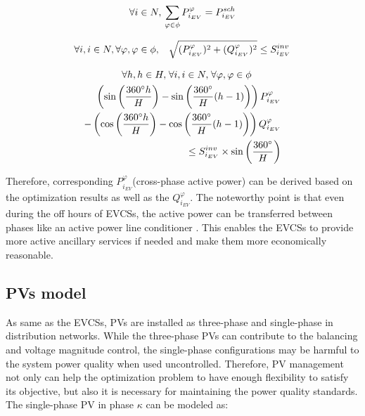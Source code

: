 \documentclass[journal]{IEEEtran}
\begin{document}
\begin{equation}\label{three_phase_EVCSs_model1}
\forall i \in N, \hskip 2pt \displaystyle\sum _{\varphi \in \phi} P_{i_{EV}}^{\varphi} = P_{i_{EV}}^{sch}
\end{equation}

\begin{equation}\label{three_phase_EVCSs_model2}
\forall i, i \in N, \forall \varphi, \varphi \in \phi, \hskip 0.7pc \sqrt{(P_{i_{EV}}^{\varphi})^2 +(Q_{i_{EV}}^{\varphi})^2} \leq S_{i_{EV}}^{inv}
\end{equation}

\begin{equation}\label{three_phase_EVCSs_model3}
\begin{split}
\forall h, h \in H, \hskip 1pt \forall i, i \in N, \hskip 1pt \forall \varphi, \varphi \in \phi \hskip 30pt \\ \left(\sin\left(\frac{360^\circ h}{H}\right)- \sin\left(\frac{360^\circ}{H}(h-1)\right)\right)P_{i_{EV}}^{\varphi} \\
-\left(\cos\left(\frac{360^\circ h}{H}\right)- \cos\left(\frac{360^\circ}{H}(h-1)\right)\right)Q_{i_{EV}}^{\varphi} \\ \leq S_{i_{EV}}^{inv} \times \sin\left(\frac{360^\circ}{H}\right)
\end{split}
\end{equation}

Therefore, corresponding $P_{i_{EV}}^{\varphi}$(cross-phase active power) can be derived based on the optimization results as well as the $Q_{i_{EV}}^{\varphi}$. The noteworthy point is that even during the off hours of EVCSs, the active power can be transferred between phases like an active power line conditioner \cite{salmeron2004compensation}. This enables the EVCSs to provide more active ancillary services if needed and make them more economically reasonable.

\subsection{PVs model}

As same as the EVCSs, PVs are installed as three-phase and single-phase in distribution networks. While the three-phase PVs can contribute to the balancing and voltage magnitude control, the single-phase configurations may be harmful to the system power quality when used uncontrolled. Therefore, PV management not only can help the optimization problem to have enough flexibility to satisfy its objective, but also it is necessary for maintaining the power quality standards. The single-phase PV in phase $\kappa$ can be modeled as:
\end{document}

